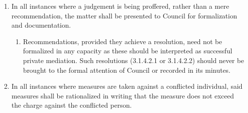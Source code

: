 \begin{enumerate} [align=left]
\begin{enumerate} [label*=\arabic*., align=left]
\begin{enumerate} [label*=\arabic*., align=left]
\item A ban from committee proceedings, or other specific activities, or
\item A ban from the Society not exceeding twelve (12) months.
\end{enumerate}
\item In all instances where a judgement is being proffered, rather than a mere recommendation, the matter shall be presented to Council for formalization and documentation.
\begin{enumerate} [label*=\arabic*., align=left]
\item Recommendations, provided they achieve a resolution, need not be formalized in any capacity as these should be interpreted as successful private mediation. Such resolutions (3.1.4.2.1 or 3.1.4.2.2) should never be brought to the formal attention of Council or recorded in its minutes.
\end{enumerate}
\item In all instances where measures are taken against a conflicted individual, said measures shall be rationalized in writing that the measure does not exceed the charge against the conflicted person.
\end{enumerate}
\end{enumerate}